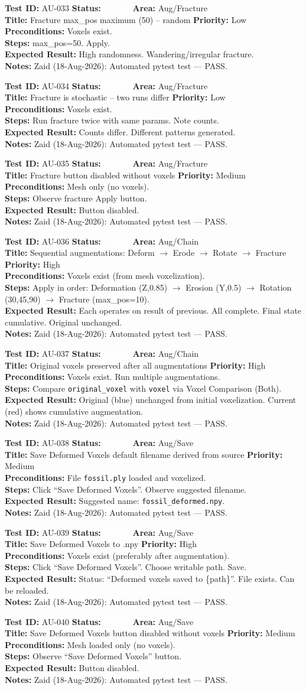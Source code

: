 \documentclass[12pt,a4paper]{article}
\newcommand{\statuspass}{\colorbox{statusgreen}{\textcolor{white}{\textbf{\,PASS\,}}}}
\newcommand{\testcase}[9]{%
  \smallskip
  \noindent\textbf{Test ID:} #1 \hfill \textbf{Status:} #2 \hfill \textbf{Area:} #3 \\
  \textbf{Title:} #4 \hfill \textbf{Priority:} #5 \\[0.3em]
  \textbf{Preconditions:} #6 \\[0.3em]
  \textbf{Steps:} #7 \\[0.3em]
  \textbf{Expected Result:} #8 \\
  \textbf{Notes:} #9
  \smallskip
}
\begin{document}
\testcase{AU-033}{\statuspass}{Aug/Fracture}{Fracture max\_pos maximum (50) -- random}{Low}{Voxels exist.}{max\_pos=50. Apply.}{High randomness. Wandering/irregular fracture.}{Zaid (18-Aug-2026): Automated pytest test --- PASS.}


\testcase{AU-034}{\statuspass}{Aug/Fracture}{Fracture is stochastic -- two runs differ}{Low}{Voxels exist.}{Run fracture twice with same params. Note counts.}{Counts differ. Different patterns generated.}{Zaid (18-Aug-2026): Automated pytest test --- PASS.}


\testcase{AU-035}{\statuspass}{Aug/Fracture}{Fracture button disabled without voxels}{Medium}{Mesh only (no voxels).}{Observe fracture Apply button.}{Button disabled.}{Zaid (18-Aug-2026): Automated pytest test --- PASS.}


\testcase{AU-036}{\statuspass}{Aug/Chain}{Sequential augmentations: Deform $\rightarrow$ Erode $\rightarrow$ Rotate $\rightarrow$ Fracture}{High}{Voxels exist (from mesh voxelization).}{Apply in order: Deformation (Z,0.85) $\rightarrow$ Erosion (Y,0.5) $\rightarrow$ Rotation (30\textdegree,45\textdegree,90\textdegree) $\rightarrow$ Fracture (max\_pos=10).}{Each operates on result of previous. All complete. Final state cumulative. Original unchanged.}{Zaid (18-Aug-2026): Automated pytest test --- PASS.}


\testcase{AU-037}{\statuspass}{Aug/Chain}{Original voxels preserved after all augmentations}{High}{Voxels exist. Run multiple augmentations.}{Compare \texttt{original\_voxel} with \texttt{voxel} via Voxel Comparison (Both).}{Original (blue) unchanged from initial voxelization. Current (red) shows cumulative augmentation.}{Zaid (18-Aug-2026): Automated pytest test --- PASS.}


\testcase{AU-038}{\statuspass}{Aug/Save}{Save Deformed Voxels default filename derived from source}{Medium}{File \texttt{fossil.ply} loaded and voxelized.}{Click ``Save Deformed Voxels''. Observe suggested filename.}{Suggested name: \texttt{fossil\_deformed.npy}.}{Zaid (18-Aug-2026): Automated pytest test --- PASS.}


\testcase{AU-039}{\statuspass}{Aug/Save}{Save Deformed Voxels to .npy}{High}{Voxels exist (preferably after augmentation).}{Click ``Save Deformed Voxels''. Choose writable path. Save.}{Status: ``Deformed voxels saved to \{path\}''. File exists. Can be reloaded.}{Zaid (18-Aug-2026): Automated pytest test --- PASS.}


\testcase{AU-040}{\statuspass}{Aug/Save}{Save Deformed Voxels button disabled without voxels}{Medium}{Mesh loaded only (no voxels).}{Observe ``Save Deformed Voxels'' button.}{Button disabled.}{Zaid (18-Aug-2026): Automated pytest test --- PASS.}
\end{document}
